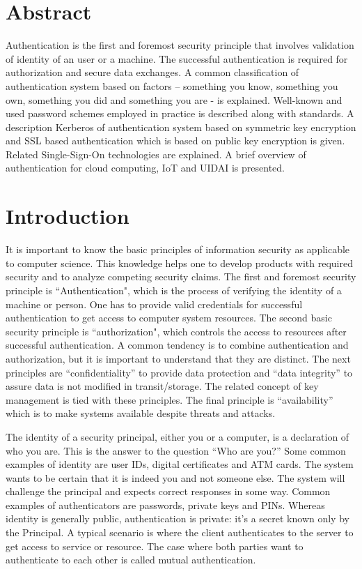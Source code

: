 \begin{multicols}{2}

\section*{Abstract}

Authentication is the first and foremost security principle that involves validation of identity of an user or a machine. The successful authentication is required for authorization and secure data exchanges. A common classification of authentication system based on factors -- something you know, something you own, something you did and something you are - is explained. Well-known and used password schemes employed in practice is described along with standards. A description Kerberos of authentication system based on symmetric key encryption and SSL based authentication which is based on public key encryption is given. Related Single-Sign-On technologies are explained. A brief overview of authentication for cloud computing, IoT and UIDAI is presented.\\[-15pt]

\section{Introduction}

It is important to know the basic principles of information security as applicable to computer science. This knowledge helps one to develop products with required security and to analyze competing security claims. The first and foremost security principle is ``Authentication", which is the process of verifying the identity of a machine or person. One has to provide valid credentials for successful authentication to get access to computer system resources. The second basic security principle is ``authorization", which controls the access to resources after successful authentication. A common tendency is to combine authentication and authorization, but it is important to understand that they are distinct. The next principles are ``confidentiality'' to provide data protection and ``data integrity'' to assure data is not modified in transit/storage. The related concept of key management is tied with these principles. The final principle is ``availability'' which is to make systems available despite threats and attacks.

The identity of a security principal, either you or a computer, is a declaration of who you are. This is the answer to the question ``Who are you?'' Some common examples of identity are user IDs, digital certificates and ATM cards. The system wants to be certain that it is indeed you and not someone else. The system will challenge the principal and expects correct responses in some way. Common examples of authenticators are passwords, private keys and PINs. Whereas identity is generally public, authentication is private: it's a secret known only by the Principal. A typical scenario is where the client authenticates to the server to get access to service or resource. The case where both parties want to authenticate to each other is called mutual authentication. 


\end{multicols}
